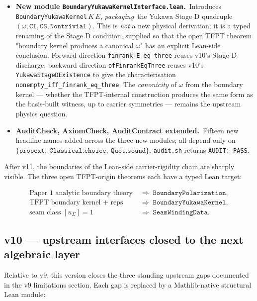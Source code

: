 \begin{itemize}[leftmargin=1.6em, itemsep=2pt]
\item \textbf{New module \texttt{BoundaryYukawaKernelInterface.lean}.}\
    Introduces \texttt{BoundaryYukawaKernel}\,$K\,E$,
    \emph{packaging}\ the Yukawa Stage D quadruple
    $(\omega, \texttt{CI}, \texttt{CS}, \texttt{Nontrivial})$.
    This is \emph{not} a new physical derivation; it is a
    typed renaming of the Stage D condition, supplied so that
    the open TFPT theorem
    "boundary kernel produces a canonical $\omega$" has an
    explicit Lean-side conclusion. Forward direction
    \texttt{finrank\_E\_eq\_three} reuses v10's Stage D
    discharge; backward direction \texttt{ofFinrankEqThree}
    reuses v10's \texttt{YukawaStageDExistence} to give the
    characterisation
    \texttt{nonempty\_iff\_finrank\_eq\_three}. The
    \emph{canonicity} of $\omega$ from the boundary kernel
    --- whether the TFPT-internal construction produces the
    same form as the basis-built witness, up to carrier
    symmetries --- remains the upstream physics question.

\item \textbf{AuditCheck, AxiomCheck, AuditContract extended.}\
    Fifteen new headline names added across the three new
    modules; all depend only on
    $\{\texttt{propext},\ \texttt{Classical.choice},\
    \texttt{Quot.sound}\}$. \texttt{audit.sh} returns
    \texttt{AUDIT:\ PASS}.
\end{itemize}

\smallskip
After v11, the boundaries of the Lean-side carrier-rigidity
chain are sharply visible. The three open TFPT-origin theorems
each have a typed Lean target:

\[
\begin{aligned}
\text{Paper 1 analytic boundary theory}
&\;\Rightarrow\; \texttt{BoundaryPolarization}, \\
\text{TFPT boundary kernel + reps}
&\;\Rightarrow\; \texttt{BoundaryYukawaKernel}, \\
\text{seam class }[u_\Sigma] = 1
&\;\Rightarrow\; \texttt{SeamWindingData}.
\end{aligned}
\]

\subsection*{v10 --- upstream interfaces closed to the next
algebraic layer}

Relative to v9, this version closes the three standing upstream
gaps documented in the v9 limitations section. Each gap is
replaced by a Mathlib-native structural Lean module:

